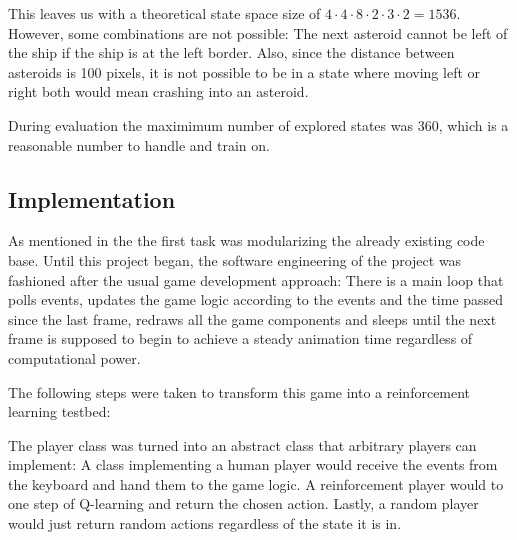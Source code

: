 \documentclass[a4paper,10pt]{article}
\begin{document}

This leaves us with a theoretical state space size of $4 \cdot 4 \cdot 8 \cdot 2 \cdot 3 \cdot 2 = 1536$.
However, some combinations are not possible: The next asteroid cannot be left of the ship if the ship is at the left border.
Also, since the distance between asteroids is 100 pixels, it is not possible to be in a state where moving left or right both would mean crashing into an asteroid.

During evaluation the maximimum number of explored states was $360$, which is a reasonable number to handle and train on.



\subsection{Implementation}

As mentioned in the  the first task was modularizing the already existing code base.
Until this project began, the software engineering of the project was fashioned after the usual game development approach:
There is a main loop that polls events, updates the game logic according to the events and the time passed since the last frame, redraws all the game components and sleeps until the next frame is supposed to begin to achieve a steady animation time regardless of computational power.

The following steps were taken to transform this game into a reinforcement learning testbed:

The player class was turned into an abstract class that arbitrary players can implement: A class implementing a human player would receive the events from the keyboard and hand them to the game logic.
A reinforcement player would to one step of Q-learning and return the chosen action.
Lastly, a random player would just return random actions regardless of the state it is in.
\end{document}

